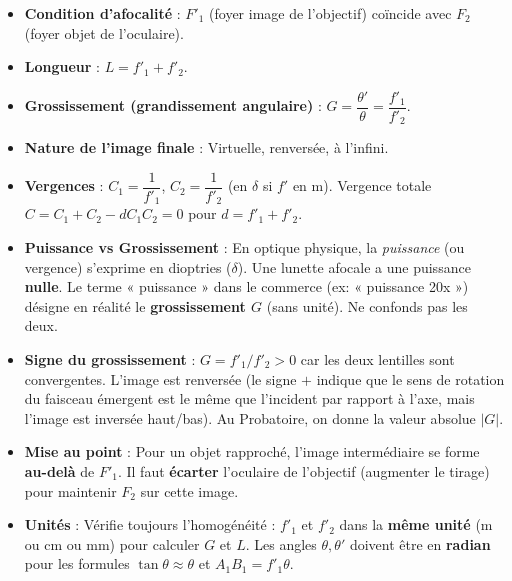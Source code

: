 \documentclass[11pt]{article}
\begin{document}
\begin{aretenir}
\begin{itemize}
\item \textbf{Condition d'afocalité} : $F'_1$ (foyer image de l'objectif) coïncide avec $F_2$ (foyer objet de l'oculaire).
\item \textbf{Longueur} : $L = f'_1 + f'_2$.
\item \textbf{Grossissement (grandissement angulaire)} : $G = \dfrac{\theta'}{\theta} = \dfrac{f'_1}{f'_2}$.
\item \textbf{Nature de l'image finale} : Virtuelle, renversée, à l'infini.
\item \textbf{Vergences} : $C_1 = \dfrac{1}{f'_1}$, $C_2 = \dfrac{1}{f'_2}$ (en $\delta$ si $f'$ en m). Vergence totale $C = C_1 + C_2 - d C_1 C_2 = 0$ pour $d = f'_1 + f'_2$.
\end{itemize}
\end{aretenir}

\begin{attention}
\begin{itemize}
\item \textbf{Puissance vs Grossissement} : En optique physique, la \emph{puissance} (ou vergence) s'exprime en dioptries ($\delta$). Une lunette afocale a une puissance \textbf{nulle}. Le terme « puissance » dans le commerce (ex: « puissance 20x ») désigne en réalité le \textbf{grossissement $G$} (sans unité). Ne confonds pas les deux.
\item \textbf{Signe du grossissement} : $G = f'_1/f'_2 > 0$ car les deux lentilles sont convergentes. L'image est renversée (le signe $+$ indique que le sens de rotation du faisceau émergent est le même que l'incident par rapport à l'axe, mais l'image est inversée haut/bas). Au Probatoire, on donne la valeur absolue $|G|$.
\item \textbf{Mise au point} : Pour un objet rapproché, l'image intermédiaire se forme \textbf{au-delà} de $F'_1$. Il faut \textbf{écarter} l'oculaire de l'objectif (augmenter le tirage) pour maintenir $F_2$ sur cette image.
\item \textbf{Unités} : Vérifie toujours l'homogénéité : $f'_1$ et $f'_2$ dans la \textbf{même unité} (m ou cm ou mm) pour calculer $G$ et $L$. Les angles $\theta, \theta'$ doivent être en \textbf{radian} pour les formules $\tan\theta \approx \theta$ et $A_1B_1 = f'_1 \theta$.
\end{itemize}
\end{attention}
\end{document}
